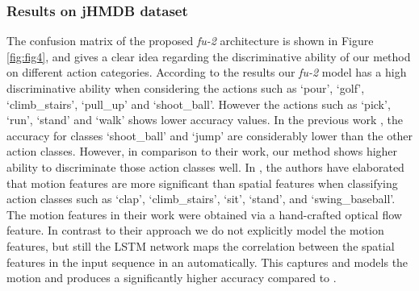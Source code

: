 \documentclass[10pt,twocolumn,letterpaper]{article}
\begin{document}
\vspace{-7 mm}
 \subsubsection{Results on jHMDB dataset}
 
 



The confusion matrix of the proposed \textit{fu-2} architecture is shown in Figure \ref{fig:fig4}, and gives a clear idea regarding the discriminative ability of our method on different action categories. According to the results our \textit{fu-2} model has a high discriminative ability when considering the actions such as `pour', `golf', `climb\_stairs', `pull\_up' and `shoot\_ball'. However the actions such as `pick', `run', `stand' and `walk' shows lower accuracy values.  In the previous work \cite{actiontubes}, the accuracy for classes `shoot\_ball' and `jump' are considerably lower than the other action classes. However, in comparison to their work, our method shows higher ability to discriminate those action classes well. In \cite{actiontubes}, the authors have elaborated that motion features are more significant than spatial features when classifying action classes such as `clap', `climb\_stairs', `sit', `stand', and `swing\_baseball'. The motion features in their work were obtained via a hand-crafted optical flow feature. In contrast to their approach we do not explicitly model the motion features, but still the LSTM network maps the correlation between the spatial features in the input sequence in an automatically. This captures and models the motion and produces a significantly higher accuracy compared to \cite{actiontubes}. 
          
\end{document}
